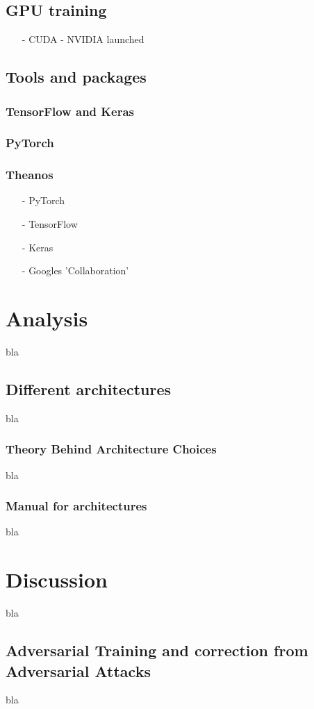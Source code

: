 \documentclass[a4paper,11pt]{article}
\begin{document}
\subsection{GPU training}
\begin{itemize}
	\item[-] CUDA - NVIDIA launched 
\end{itemize}
\subsection{Tools and packages}
\subsubsection{TensorFlow and Keras}
\subsubsection{PyTorch}
\subsubsection{Theanos}
\begin{itemize}
	\item[-] PyTorch
	\item[-] TensorFlow
	\item[-] Keras
	\item[-] Googles 'Collaboration'
\end{itemize}
\section{Analysis}
bla
\subsection{Different architectures}
bla
\subsubsection{Theory Behind Architecture Choices}
bla
\subsubsection{Manual for architectures}
bla
\section{Discussion}
bla
\subsection{Adversarial Training and correction from Adversarial Attacks}
bla
\end{document}
